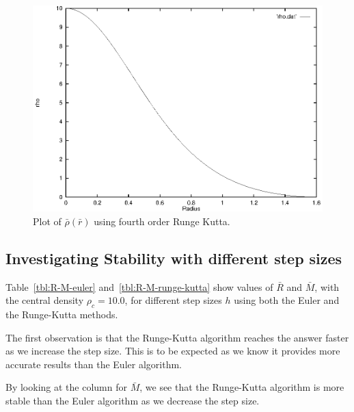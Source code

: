 \documentclass[a4paper]{IEEEtran}
\begin{document}
    \begin{figure} 
    \caption{Plot of $\bar{\rho}(\bar{r})$ using fourth order Runge Kutta.}
    \label{fig:density-runge-kutta} 
    \begin{center}
        \includegraphics[width=\columnwidth]{figures/density-rk-01}
    \end{center}
    \end{figure} 


    \subsection{Investigating Stability with different step sizes}
    Table~\ref{tbl:R-M-euler} and~\ref{tbl:R-M-runge-kutta}
    show values of $\bar{R}$ and $\bar{M}$, with
    the central density $\rho_c = 10.0$, for different step 
    sizes $h$ using both the Euler and the Runge-Kutta methods.

    The first observation is that the Runge-Kutta algorithm reaches
    the answer faster as we increase the step size. This is to
    be expected as we know it provides more accurate results
    than the Euler algorithm.

    By looking at the column for $\bar{M}$, we see that the Runge-Kutta
    algorithm is more stable than the Euler algorithm as we decrease
    the step size.
\end{document}
